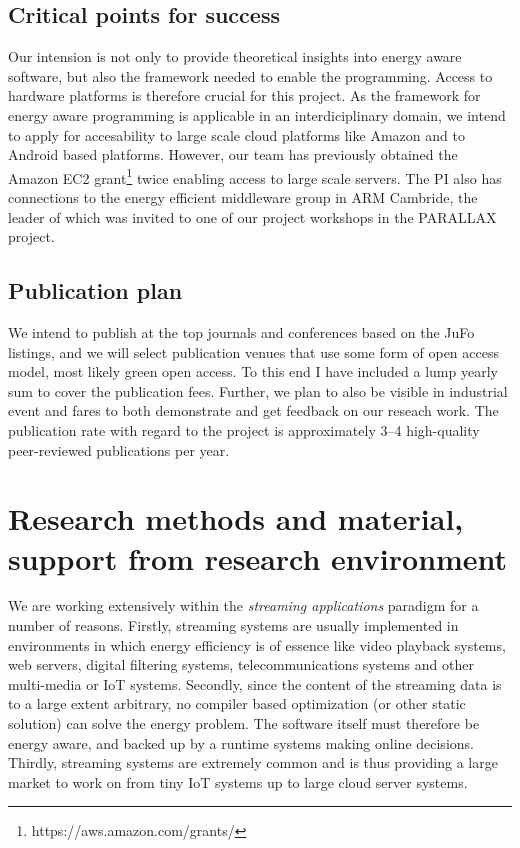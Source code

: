 \documentclass{article}
\begin{document}
\subsection{Critical points for success}
Our intension is not only to provide theoretical insights into energy aware software, but also the framework needed to enable the programming.
Access to hardware platforms is therefore crucial for this project.
As the framework for energy aware programming is applicable in an interdiciplinary domain, we intend to apply for accesability to large scale cloud platforms like Amazon and to Android based platforms.
However, our team has previously obtained the Amazon EC2 grant\footnote{https://aws.amazon.com/grants/} twice enabling access to large scale servers.
The PI also has connections to the energy efficient middleware group in ARM Cambride, the leader of which was invited to one of our project workshops in the PARALLAX project.

\subsection{Publication plan}
We intend to publish at the top journals and conferences based on the JuFo listings, and we will select publication venues that use some form of open access model, most likely green open access. 
To this end I have included a lump yearly sum to cover the publication fees. 
Further, we plan to also be visible in industrial event and fares to both demonstrate and get feedback on our reseach work.
The publication rate with regard to the project is approximately 3--4 high-quality peer-reviewed publications per year.

\section{Research methods and material, support from research environment}

We are working extensively within the \textit{streaming applications} paradigm for a number of reasons. 
Firstly, streaming systems are usually implemented in environments in which energy efficiency is of essence like video playback systems, web servers, digital filtering systems, telecommunications systems and other multi-media or IoT systems. 
Secondly, since the content of the streaming data is to a large extent arbitrary, no compiler based optimization (or other static solution) can solve the energy problem. 
The software itself must therefore be energy aware, and backed up by a runtime systems making online decisions. 
Thirdly, streaming systems are extremely common and is thus providing a large market to work on from tiny IoT systems up to large cloud server systems.
\end{document}
